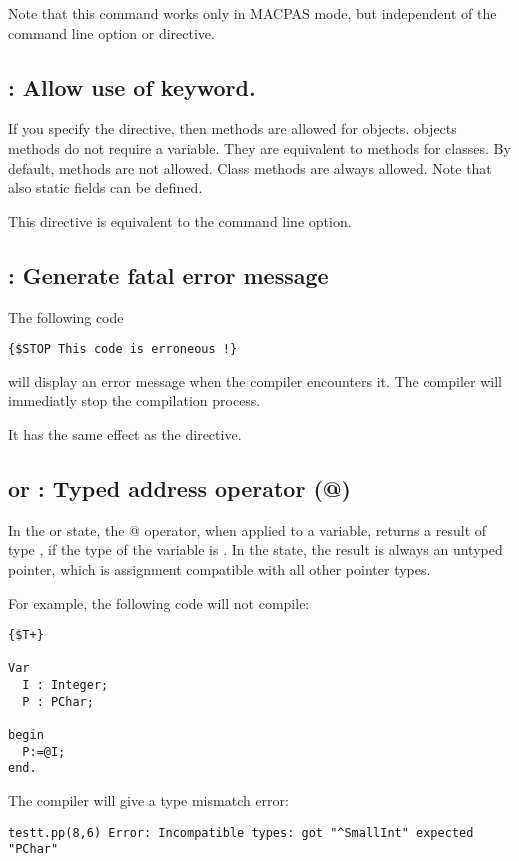 Note that this command works only in MACPAS mode, but independent of the
 command line option or  directive.


\subsection{ : Allow use of  keyword.}

If you specify the  directive, then 
methods are allowed for objects.  objects methods do not require
a  variable. They are equivalent to  methods for
classes. By default,  methods are not allowed. Class methods
are always allowed. Note that also static fields can be defined.

This directive is equivalent to the  command line option.

\subsection{ : Generate fatal error message}

The following code
\begin{verbatim}
{$STOP This code is erroneous !}
\end{verbatim}
will display an error message when the compiler encounters it.
The compiler will immediatly stop the compilation process.

It has the same effect as the  directive.

\subsection{ or  : Typed address operator (@)}

In the  or  state, the @ operator,
when applied to a variable, returns a result of type , if the
type of the variable is . In the  state, the result is
always an untyped pointer, which is assignment compatible with all other
pointer types.

For example, the following code will not compile:
\begin{verbatim}
{$T+}

Var
  I : Integer;
  P : PChar;

begin
  P:=@I;
end.
\end{verbatim}
The compiler will give a type mismatch error:
\begin{verbatim}
testt.pp(8,6) Error: Incompatible types: got "^SmallInt" expected "PChar"
\end{verbatim}

